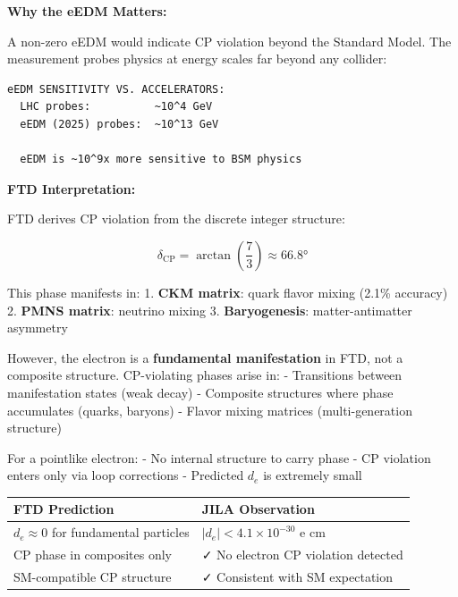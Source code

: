 \documentclass[
  11pt,
  letterpaper,
  twoside,
  openright]{book}
\begin{document}
\textbf{Why the eEDM Matters:}

A non-zero eEDM would indicate CP violation beyond the Standard Model.
The measurement probes physics at energy scales far beyond any collider:

\begin{verbatim}
eEDM SENSITIVITY VS. ACCELERATORS:
  LHC probes:          ~10^4 GeV
  eEDM (2025) probes:  ~10^13 GeV

  eEDM is ~10^9x more sensitive to BSM physics
\end{verbatim}

\textbf{FTD Interpretation:}

FTD derives CP violation from the discrete integer structure:

\[\delta_{\text{CP}} = \arctan\left(\frac{7}{3}\right) \approx 66.8°\]

This phase manifests in: 1. \textbf{CKM matrix}: quark flavor mixing
(2.1\% accuracy) 2. \textbf{PMNS matrix}: neutrino mixing 3.
\textbf{Baryogenesis}: matter-antimatter asymmetry

However, the electron is a \textbf{fundamental manifestation} in FTD,
not a composite structure. CP-violating phases arise in: - Transitions
between manifestation states (weak decay) - Composite structures where
phase accumulates (quarks, baryons) - Flavor mixing matrices
(multi-generation structure)

For a pointlike electron: - No internal structure to carry phase - CP
violation enters only via loop corrections - Predicted \(d_e\) is
extremely small

\begin{longtable}[]{@{}
  >{\raggedright\arraybackslash}p{}
  >{\raggedright\arraybackslash}p{}@{}}
\toprule\noalign{}
\begin{minipage}[b]{\linewidth}\raggedright
FTD Prediction
\end{minipage} & \begin{minipage}[b]{\linewidth}\raggedright
JILA Observation
\end{minipage} \\
\midrule\noalign{}
\endhead
\bottomrule\noalign{}
\endlastfoot
\(d_e \approx 0\) for fundamental particles &
\(|d_e| < 4.1 \times 10^{-30}\) e cm \\
CP phase in composites only & ✓ No electron CP violation detected \\
SM-compatible CP structure & ✓ Consistent with SM expectation \\
\end{longtable}
\end{document}
